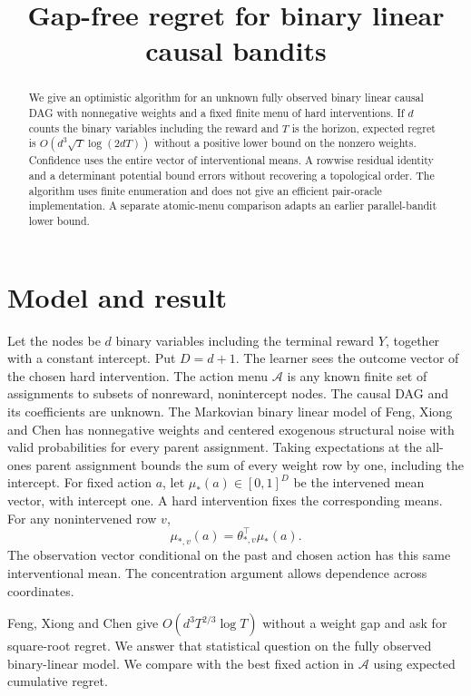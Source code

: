 \documentclass[11pt,a4paper]{amsart}
\title[Gap-free binary linear causal bandits]{Gap-free regret for binary linear causal bandits}
\date{}
\begin{document}
\begin{abstract}
We give an optimistic algorithm for an unknown fully observed binary linear causal DAG with nonnegative weights and a fixed finite menu of hard interventions. If $d$ counts the binary variables including the reward and $T$ is the horizon, expected regret is $O(d^3\sqrt{T}\log(2dT))$ without a positive lower bound on the nonzero weights. Confidence uses the entire vector of interventional means. A rowwise residual identity and a determinant potential bound errors without recovering a topological order. The algorithm uses finite enumeration and does not give an efficient pair-oracle implementation. A separate atomic-menu comparison adapts an earlier parallel-bandit lower bound.
\end{abstract}
\maketitle

\section{Model and result}
Let the nodes be $d$ binary variables including the terminal reward $Y$, together with a constant intercept. Put $D=d+1$. The learner sees the outcome vector of the chosen hard intervention. The action menu $\mathcal A$ is any known finite set of assignments to subsets of nonreward, nonintercept nodes. The causal DAG and its coefficients are unknown. The Markovian binary linear model of Feng, Xiong and Chen \cite[\S3]{feng} has nonnegative weights and centered exogenous structural noise with valid probabilities for every parent assignment. Taking expectations at the all-ones parent assignment bounds the sum of every weight row by one, including the intercept. For fixed action $a$, let $\mu_*(a)\in[0,1]^D$ be the intervened mean vector, with intercept one. A hard intervention fixes the corresponding means. For any nonintervened row $v$,
\[
                     \mu_{*,v}(a)=\theta_{*,v}^{\top}\mu_*(a).
\]
The observation vector conditional on the past and chosen action has this same interventional mean. The concentration argument allows dependence across coordinates.

Feng, Xiong and Chen \cite[Theorem 9 and following paragraph]{feng} give $O(d^3T^{2/3}\log T)$ without a weight gap and ask for square-root regret. We answer that statistical question on the fully observed binary-linear model. We compare with the best fixed action in $\mathcal A$ using expected cumulative regret.
\end{document}
